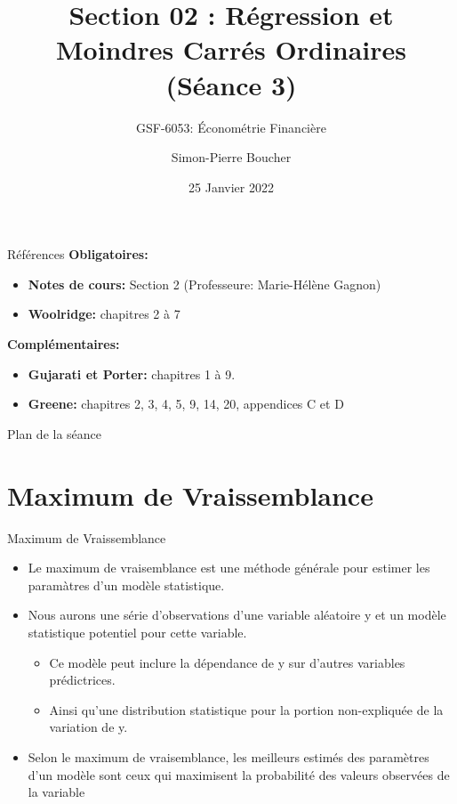 \documentclass{beamer}
\title[S02 Régression et MCO]{Section 02 : Régression et Moindres Carrés Ordinaires\\ (Séance 3)}
\subtitle{GSF-6053: Économétrie Financière}
\author[SP. Boucher]{Simon-Pierre Boucher\inst{1}}
\institute[Université Laval]
{
  \inst{1}%
  Département de finance, assurance et immobilier\\
  Faculté des sciences de l'administration\\
  Université Laval}
\date[Hiver 2022]{25 Janvier 2022}
\begin{document}
\begin{frame}
  \titlepage
\end{frame}


\begin{frame}{Références}
\textbf{Obligatoires:}
\begin{itemize}
\item \textbf{Notes de cours:} Section 2 (Professeure: Marie-Hélène Gagnon)
\item \textbf{Woolridge:} chapitres 2 à 7
\end{itemize}
\vspace{0.5cm}
\textbf{Complémentaires:}
\begin{itemize}
\item \textbf{Gujarati et Porter:} chapitres 1 à 9.
\item \textbf{Greene:} chapitres 2, 3, 4, 5, 9, 14, 20, appendices C et D
\end{itemize}
\end{frame}


\begin{frame}{Plan de la séance}
  \tableofcontents
\end{frame}

\section{Maximum de Vraissemblance}

\frame{\tableofcontents[current]}

\begin{frame}{Maximum de Vraissemblance}
\begin{itemize}
\item Le maximum de vraisemblance est une méthode générale pour estimer les paramàtres d’un modèle statistique.
\item Nous aurons une série d’observations d’une variable aléatoire y et un modèle statistique potentiel pour cette variable.
\begin{itemize}
\item Ce modèle peut inclure la dépendance de y sur d’autres variables prédictrices.
\item Ainsi qu’une distribution statistique pour la portion non-expliquée de la variation de y.
\end{itemize}
\item Selon le maximum de vraisemblance, les meilleurs estimés des paramètres d’un modèle sont ceux qui maximisent la probabilité des valeurs observées de la variable
\end{itemize}
\end{frame}
\end{document}
